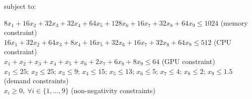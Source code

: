 \documentclass[addpoints, 12pt]{exam}
\begin{document}
\begin{enumerate}[a)]
{\begin{minipage}[2\height]{\dimexpr\textwidth-11\fboxsep\fboxrule\relax}
	subject to: \medskip

	$8x_{1} + 16x_{2} + 32x_{3} + 32x_{4} + 64x_{5} + 128x_{6} + 16x_{7} + 32x_{8} + 
	64x_{9} \leq 1024 $ (memory constraint) \\
	
	$16x_{1} + 32x_{2} + 64x_{3} + 8x_{4} + 16x_{5} + 32x_{6} + 16x_{7} + 32x_{8} + 
	64x_{9} \leq 512$ (CPU constraint) \\
	
	$x_1 + x_2 + x_3 + x_4 + x_5 + x_6 + 2x_7 + 6x_8 + 8x_9 \leq 64$ (GPU constraint)\\
	
	$x_1 \leq 25$; $x_2 \leq 25$; $x_3 \leq 9$; $x_4 \leq 15$; $x_5 \leq 13$; $x_6 \leq 5$;
	$x_7 \leq 4$; $x_8 \leq 2$; $x_9 \leq 1.5$\\ 
	(demand constraints) \\

	$x_i \geq 0,~\forall i \in \{1,...,9\}$ (non-negativity constraints)
	\end{minipage}} \\\\
\end{enumerate}
 
\end{document}
